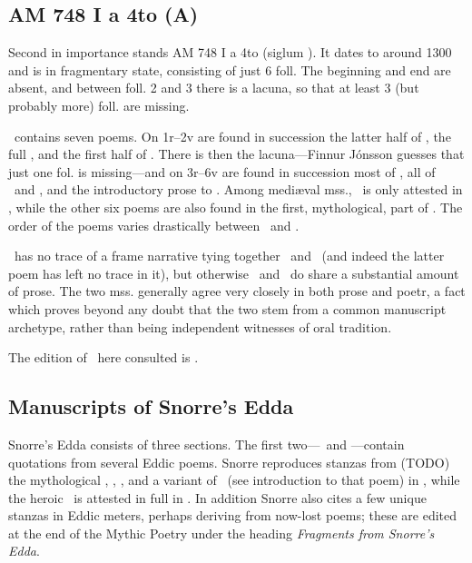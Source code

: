 \subsection{AM 748 I a 4to (A)}

Second in importance stands AM 748 I a 4to (siglum \AM).  It dates to around 1300 and is in fragmentary state, consisting of just 6 foll.  The beginning and end are absent, and between foll. 2 and 3 there is a lacuna, so that at least 3 (but probably more) foll. are missing.

\AM\ contains seven poems.  On 1r–2v are found in succession the latter half of \Harbardsljod, the full \Baldrsdraumar, and the first half of \Skirnismal.  There is then the lacuna—Finnur Jónsson guesses that just one fol. is missing—and on 3r–6v are found in succession most of \Vafthrudnismal, all of \Grimnismal\ and \Hymiskvida, and the introductory prose to \Volundarkvida.  Among mediæval mss., \Baldrsdraumar\ is only attested in \AM, while the other six poems are also found in the first, mythological, part of \Regius. The order of the poems varies drastically between \AM\ and \Regius.

\AM\ has no trace of a frame narrative tying together \Hymiskvida\ and \Lokasenna\ (and indeed the latter poem has left no trace in it), but otherwise \AM\ and \Regius\ do share a substantial amount of prose.  The two mss. generally agree very closely in both prose and poetr, a fact which proves beyond any doubt that the two stem from a common manuscript archetype, rather than being independent witnesses of oral tradition.

The edition of \AM\ here consulted is \textcite{Finnur1896}.

\subsection{Manuscripts of Snorre’s Edda}

Snorre’s Edda consists of three sections.  The first two—\Gylfaginning\ and \Skaldskaparmal—contain quotations from several Eddic poems.  Snorre reproduces stanzas from (TODO) the mythological \Voluspa, \Vafthrudnismal, \Grimnismal, and a variant of \Lokasenna\ (see introduction to that poem) in \Gylfaginning, while the heroic \Grottasongr\ is attested in full in \Skaldskaparmal.  In addition Snorre also cites a few unique stanzas in Eddic meters, perhaps deriving from now-lost poems; these are edited at the end of the Mythic Poetry under the heading \emph{Fragments from Snorre’s Edda}.

